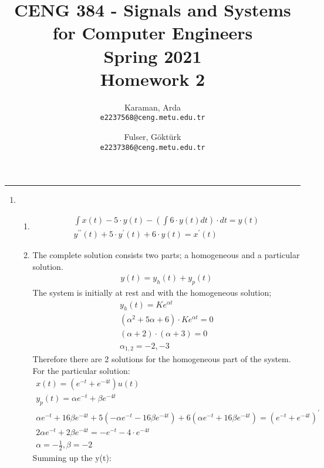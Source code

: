 \documentclass[10pt,a4paper, margin=1in]{article}
\author{
  Karaman, Arda\\
  \texttt{e2237568@ceng.metu.edu.tr}
  \and
  Fulser, Göktürk\\
  \texttt{e2237386@ceng.metu.edu.tr}
}
\title{CENG 384 - Signals and Systems for Computer Engineers \\
Spring 2021 \\
Homework 2}
\begin{document}
\maketitle



\noindent\rule{19cm}{1.2pt}

\begin{enumerate}

\item %
    \begin{enumerate}
    \item %
    \begin{align}
        \int x(t) - 5 \cdot y(t) - (\int 6 \cdot y(t)dt) \cdot dt = y(t) \\
        y^{\prime\prime}(t) + 5 \cdot y^{\prime}(t) + 6 \cdot y(t) = x^{\prime}(t)
    \end{align}
    \item %
    The complete solution consists two parts; a homogeneous and a particular solution. \\
    \begin{align}
        y(t) = y_{h}(t) + y_{p}(t)
    \end{align}
    The system is initially at rest and with the homogeneous solution;
    \begin{align}
        y_{h}(t) = K e^{\alpha t} \\
        (\alpha^{2} + 5 \alpha + 6) \cdot Ke^{\alpha t} = 0 \\
        (\alpha + 2) \cdot (\alpha + 3) = 0 \\
        \alpha_{1,2} = -2,-3
    \end{align}
    Therefore there are 2 solutions for the homogeneous part of the system.
    For the particular solution:
    \begin{align}
        x(t) = (e^{-t} + e^{-4t})u(t) \\
        y_{p}(t) = \alpha e^{-t} + \beta e^{-4t} \\
        \alpha e^{-t} + 16\beta e^{-4t} + 5 (-\alpha e^{-t} - 16\beta e^{-4t}) + 6 (\alpha e^{-t} + 16\beta e^{-4t}) =  (e^{-t} + e^{-4t})^{\prime} \\
        2 \alpha e^{-t} + 2\beta e^{-4t} = -e^{-t} -4 \cdot e^{-4t} \\ 
        \alpha = -\frac{1}{2} , \beta = -2
    \end{align}
    Summing up the y(t):

\end{enumerate}
\end{enumerate}
\end{document}
